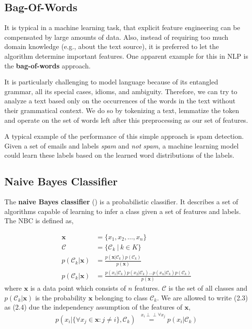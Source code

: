 \subsection{Bag-Of-Words}\label{section:bow}
It is typical in a machine learning task, that explicit feature engineering can be compensated by large amounts of data.
Also, instead of requiring too much domain knowledge (e.g., about the text source), it is preferred to let the algorithm determine important features.
One apparent example for this in NLP is the \textbf{bag-of-words} approach.

It is particularly challenging to model language because of its entangled grammar, all its special cases, idioms, and ambiguity.
Therefore, we can try to analyze a text based only on the occurrences of the words in the text without their grammatical context. We do so by tokenizing a text, lemmatize the token and operate on the set of words left after this preprocessing as our set of features.

A typical example of the performance of this simple approach is spam detection.
Given a set of emails and labels \emph{spam} and \emph{not spam}, a machine learning model could learn these labels based on the learned word distributions of the labels.

\subsection{Naive Bayes Classifier}\label{section:nbc}
The \textbf{naive Bayes classifier} () is a probabilistic classifier. It describes a set of algorithms capable of learning to infer a class given a set of features and labels. The NBC is defined as,

\begin{align}
  \boldsymbol{x} &= \{x_1, x_2, \dots, x_n\} \\
  \mathcal{C} &= \{\mathcal{C}_k \: | \: k \in K \} \\
  p(\mathcal{C}_k|\boldsymbol{x}) &= \frac{p(\boldsymbol{x} |\mathcal{C}_k) p(\mathcal{C}_k)} {p(\boldsymbol{x})} \\
  p(\mathcal{C}_k|\boldsymbol{x}) &= \frac{p(x_1 |\mathcal{C}_k)
                                       p(x_2 |\mathcal{C}_k) \dots
                                       p(x_n |\mathcal{C}_k)
                                       p(\mathcal{C}_k)}{p(\boldsymbol{x})}
\end{align}
where $\boldsymbol{x}$ is a data point which consists of $n$ features. $\mathcal{C}$ is the set of all classes and $p(\mathcal{C}_k|\boldsymbol{x})$ is the probability $\boldsymbol{x}$ belonging to class $\mathcal{C}_k$. We are allowed to write (2.3) as (2.4) due the independency assumption of the features of $\boldsymbol{x}$,
 \[p(x_i| \{\forall x_j \in \boldsymbol{x} : j \neq i \}, \mathcal{C}_k) \overset{\, \,\,\,x_i\perp\!\!\!\perp \forall x_j}{=} p(x_i|\mathcal{C}_k)\]

